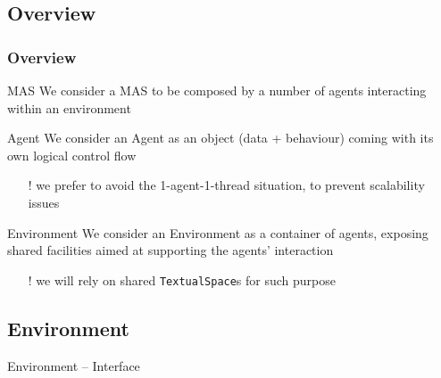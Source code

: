 \documentclass[presentation]{beamer}\mode<presentation>{\usetheme{AMSCesenaPurpleAndGold}}
\begin{document}
\subsection{Overview}

\begin{frame}
\frametitle{Overview}

	\begin{block}{MAS}
	    We consider a MAS to be composed by a number of agents \alert{interacting} within an environment
	\end{block}
	
	\vfill
	
	\begin{block}{Agent}
	    We consider an Agent as an object (data + behaviour) coming with its own \alert{logical} control flow
	\end{block}
	\begin{itemize}
	    \item[!] we prefer to avoid the \alert{1-agent-1-thread} situation, to prevent scalability issues
	\end{itemize}
	
	\vfill
	
	\begin{block}{Environment}
	    We consider an Environment as a container of agents, exposing \alert{shared} facilities aimed at \alert{supporting} the agents' interaction
	\end{block}
	\begin{itemize}
	    \item[!] we will rely on shared \alert{\texttt{TextualSpace}s} for such purpose
	\end{itemize}
\end{frame}

\subsection{Environment}

\begin{frame}[allowframebreaks]{Environment -- Interface}
    
    
    
\end{frame}
\end{document}

